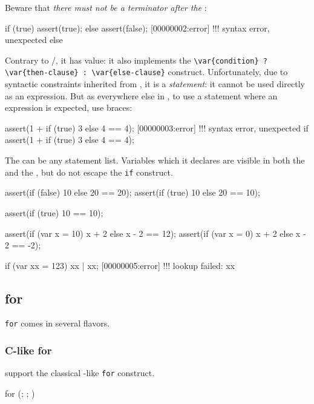 Beware that \emph{there must not be a terminator after the
  }:

\begin{urbiscript}
if (true)
  assert(true);
else
  assert(false);
[00000002:error] !!! syntax error, unexpected else
\end{urbiscript}

Contrary to \C/\Cxx, it has value: it also implements the
\lstinline|\var{condition} ? \var{then-clause} : \var{else-clause}|
construct.  Unfortunately, due to syntactic constraints inherited from
\C, it is a \emph{statement}: it cannot be used directly as an
expression.  But as everywhere else in \us, to use a statement where
an expression is expected, use braces:

\begin{urbiscript}
assert(1 + if (true) 3 else 4 == 4);
[00000003:error] !!! syntax error, unexpected if
assert(1 + { if (true) 3 else 4 } == 4);
\end{urbiscript}

The  can be any statement list.  Variables which it
declares are visible in both the  and the
, but do not escape the \lstinline|if| construct.

\begin{urbiscript}
assert({if (false) 10 else 20} == 20);
assert({if (true)  10 else 20} == 10);

assert({if (true) 10         } == 10);

assert({if (var x = 10) x + 2 else x - 2} == 12);
assert({if (var x = 0)  x + 2 else x - 2} == -2);

if (var xx = 123) xx | xx;
[00000005:error] !!! lookup failed: xx
\end{urbiscript}

\subsection{for}
\label{sec:lang:for}
\lstinline|for| comes in several flavors.

\subsubsection{C-like for}

\us support the classical \C-like \lstinline|for| construct.

\begin{urbiunchecked}
for (; ; )
\end{urbiunchecked}

